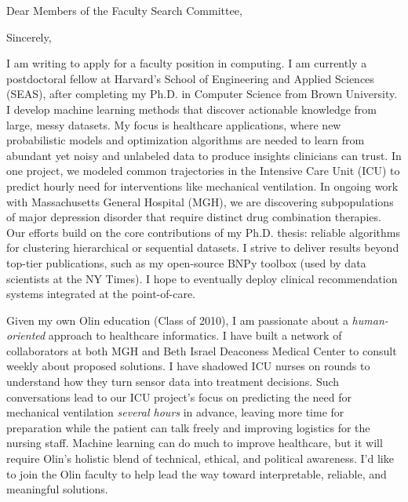 \documentclass[11pt,letterpaper,roman]{moderncv}        %
\begin{document}
\date{October 28, 2017}
\opening{Dear Members of the Faculty Search Committee,}
\closing{Sincerely,}
\makelettertitle

I am writing to apply for a faculty position in computing.
I am currently a postdoctoral fellow at Harvard's School of Engineering and Applied Sciences (SEAS), after completing my Ph.D. in Computer Science from Brown University.
I develop machine learning methods
that discover actionable knowledge from large, messy datasets. 
My focus is healthcare applications, where new probabilistic models and optimization algorithms are needed to learn from abundant yet noisy and unlabeled data to produce insights clinicians can trust.
In one project, we modeled common trajectories in the Intensive Care Unit (ICU) to predict hourly need for interventions like mechanical ventilation. In ongoing work with Massachusetts General Hospital (MGH), we are discovering subpopulations of major depression disorder that require distinct drug combination therapies. Our efforts build on the core contributions of my Ph.D. thesis: reliable algorithms for clustering hierarchical or sequential datasets.
I strive to deliver results beyond top-tier publications, such as my open-source BNPy toolbox (used by data scientists at the NY Times). I hope to eventually deploy clinical recommendation systems integrated at the point-of-care.

Given my own Olin education (Class of 2010), I am passionate about a \emph{human-oriented} approach to healthcare informatics. I have built a network of collaborators at both MGH and Beth Israel Deaconess Medical Center to consult weekly about proposed solutions. I have shadowed ICU nurses on rounds to understand how they turn sensor data into treatment decisions. Such conversations lead to our ICU project's focus on predicting the need for mechanical ventilation \emph{several hours} in advance, leaving more time for preparation while the patient can talk freely and improving logistics for the nursing staff.
Machine learning can do much to improve healthcare, but it will require Olin's holistic blend of technical, ethical, and political awareness. 
I'd like to join the Olin faculty to help lead the way toward interpretable, reliable, and meaningful solutions.
\end{document}
